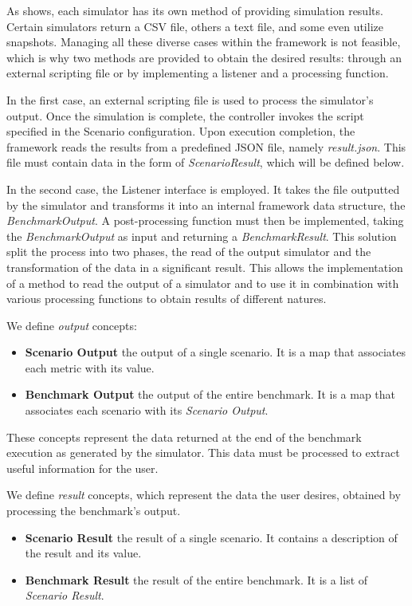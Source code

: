 \documentclass[12pt,a4paper,openright,twoside]{book}
\begin{document}
As  shows, each simulator has its own method of providing simulation results. Certain simulators return a CSV file, others a text file, and some even utilize snapshots. 
Managing all these diverse cases within the framework is not feasible, which is why two methods are provided to obtain the desired results: through an external scripting file or by implementing a listener and a processing function.

In the first case, an external scripting file is used to process the simulator's output. 
Once the simulation is complete, the controller invokes the script specified in the Scenario configuration. 
Upon execution completion, the framework reads the results from a predefined JSON file, namely \textit{result.json}. 
This file must contain data in the form of \emph{ScenarioResult}, which will be defined below.

In the second case, the Listener interface is employed. It takes the file outputted by the simulator and transforms it into an internal framework data structure, the \emph{BenchmarkOutput}. 
A post-processing function must then be implemented, taking the \emph{BenchmarkOutput} as input and returning a \emph{BenchmarkResult}. 
This solution split the process into two phases, the read of the output simulator and the transformation of the data in a significant result.
This allows the implementation of a method to read the output of a simulator and to use it in combination with various processing functions to obtain results of different natures.

We define \emph{output} concepts:
\begin{itemize}
  \item \textbf{Scenario Output} the output of a single scenario. It is a map that associates each metric with its value.
  \item \textbf{Benchmark Output} the output of the entire benchmark. It is a map that associates each scenario with its \emph{Scenario Output}.
\end{itemize}

These concepts represent the data returned at the end of the benchmark execution as generated by the simulator.
This data must be processed to extract useful information for the user.

We define \emph{result} concepts, which represent the data the user desires, obtained by processing the benchmark's output.
\begin{itemize}
  \item \textbf{Scenario Result} the result of a single scenario. It contains a description of the result and its value.
  \item \textbf{Benchmark Result} the result of the entire benchmark. It is a list of \emph{Scenario Result}.
\end{itemize}
\end{document}
